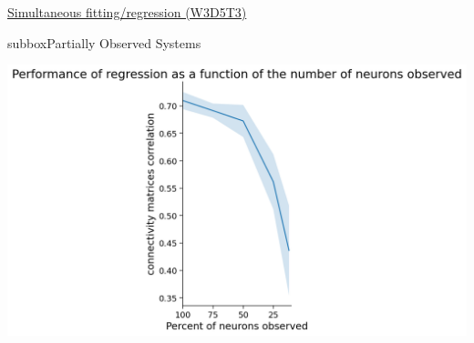 \begin{textbox}{\href{https://compneuro.neuromatch.io/tutorials/W3D5_NetworkCausality/student/W3D5_Tutorial3.html}{Simultaneous fitting/regression (W3D5T3)}   }
\begin{subbox}{subbox}{Partially Observed Systems}
\begin{center}
    
\includegraphics[scale=0.25]{Figures/NC/NC_Figure17.png}

\end{center}
\end{subbox}

\end{textbox}
\newpage

